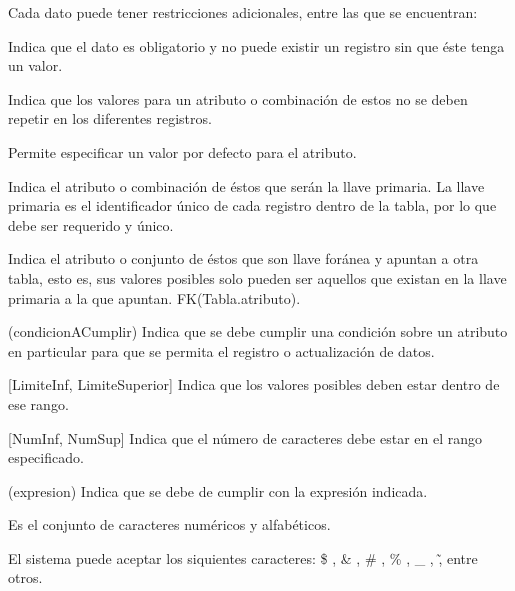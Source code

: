 Cada dato puede tener restricciones adicionales, entre las que se encuentran:
    
    \begin{bGlosario}
    
            Indica que el dato es obligatorio y no puede existir un registro sin que éste tenga
            un valor.
            
            Indica que los valores para un atributo o combinación de estos no se deben
            repetir en los diferentes registros.
            
            Permite especificar un valor por defecto para el atributo.
            
            Indica el atributo o combinación de éstos que serán la llave primaria. La llave
            primaria es el identificador único de cada registro dentro de la tabla, por lo
            que debe ser requerido y único.
            
            Indica el atributo o conjunto de éstos que son llave foránea y apuntan a otra
            tabla, esto es, sus valores posibles solo pueden ser aquellos que existan en la
            llave primaria a la que apuntan. FK(Tabla.atributo).
            
         (condicionACumplir)
            Indica que se debe cumplir una condición sobre un atributo en particular para
            que se permita el registro o actualización de datos.
            
         [LimiteInf, LimiteSuperior]
            Indica que los valores posibles deben estar dentro de ese rango.
            
        [NumInf, NumSup]
            Indica que el número de caracteres debe estar en el rango especificado.
            
         (expresion)
            Indica que se debe de cumplir con la expresión indicada.

            Es el conjunto de caracteres numéricos y alfabéticos.

            El sistema puede aceptar los siquientes caracteres: \$ , \& , \# , \% , \_ , \~ , entre otros.

            
    \end{bGlosario}
    
